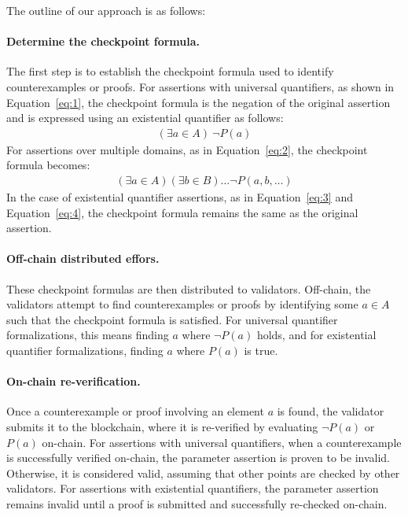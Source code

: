\documentclass[runningheads]{llncs}
\begin{document}
The outline of our approach is as follows:
\paragraph{\textbf{Determine the checkpoint formula.}}
The first step is to establish the checkpoint formula used to identify counterexamples or proofs. For assertions with universal quantifiers, as shown in Equation~\ref{eq:1}, the checkpoint formula is the negation of the original assertion and is expressed using an existential quantifier as follows: 
\begin{gather}
\label{eq:9}
(\exists a \in A) \ \neg P(a)
\end{gather}
For assertions over multiple domains, as in Equation~\ref{eq:2}, the checkpoint formula becomes:
\begin{gather}
\label{eq:10}
(\exists a \in A) (\exists b \in B) \dots  \neg P(a, b, \dots)
\end{gather}
In the case of existential quantifier assertions, as in Equation~\ref{eq:3} and Equation~\ref{eq:4}, the checkpoint formula remains the same as the original assertion.
\paragraph{\textbf{Off-chain distributed effors.}}These checkpoint formulas are then distributed to validators. Off-chain, the validators attempt to find counterexamples or proofs by identifying some \( a \in A \) such that the checkpoint formula is satisfied. For universal quantifier formalizations, this means finding \( a \) where \( \neg P(a) \) holds, and for existential quantifier formalizations, finding \( a \) where \( P(a) \) is true.
\paragraph{\textbf{On-chain re-verification.}} Once a counterexample or proof involving an element \( a \) is found, the validator submits it to the blockchain, where it is re-verified by evaluating \( \neg P(a) \) or \( P(a) \) on-chain. For assertions with universal quantifiers, when a counterexample is successfully verified on-chain, the parameter assertion is proven to be invalid. Otherwise, it is considered valid, assuming that other points are checked by other validators. For assertions with existential quantifiers, the parameter assertion remains invalid until a proof is submitted and successfully re-checked on-chain.
\end{document}
